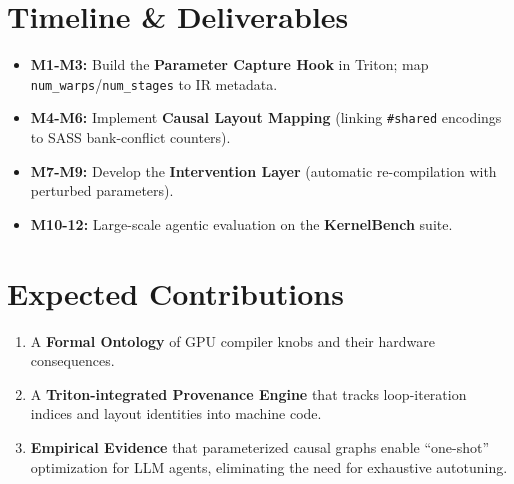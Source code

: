 \documentclass[11pt,a4paper]{article}
\begin{document}
\section{Timeline \& Deliverables}
\begin{itemize}
    \item \textbf{M1-M3:} Build the \textbf{Parameter Capture Hook} in Triton; map \texttt{num\_warps}/\texttt{num\_stages} to IR metadata.
    \item \textbf{M4-M6:} Implement \textbf{Causal Layout Mapping} (linking \texttt{\#shared} encodings to SASS bank-conflict counters).
    \item \textbf{M7-M9:} Develop the \textbf{Intervention Layer} (automatic re-compilation with perturbed parameters).
    \item \textbf{M10-12:} Large-scale agentic evaluation on the \textbf{KernelBench} suite.
\end{itemize}

\section{Expected Contributions}
\begin{enumerate}
    \item A \textbf{Formal Ontology} of GPU compiler knobs and their hardware consequences.
    \item A \textbf{Triton-integrated Provenance Engine} that tracks loop-iteration indices and layout identities into machine code.
    \item \textbf{Empirical Evidence} that parameterized causal graphs enable ``one-shot'' optimization for LLM agents, eliminating the need for exhaustive autotuning.
\end{enumerate}
\end{document}
